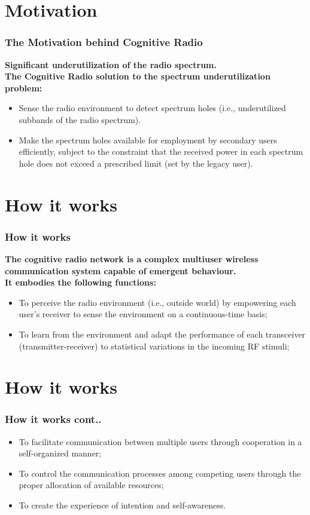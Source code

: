 \documentclass{beamer}
\begin{document}
\section{Motivation}
\begin{frame}
\frametitle{The Motivation behind Cognitive Radio}
\textbf{Significant underutilization of the radio spectrum.}\\
\textbf{The Cognitive Radio solution to the spectrum underutilization problem:}
\begin{itemize}

\item Sense the radio environment to detect spectrum holes (i.e., underutilized subbands of the radio spectrum).
\item Make the spectrum holes available for employment by secondary users efficiently, subject to the constraint that the received power in each spectrum hole does not exceed a prescribed limit (set by the legacy user).

\end{itemize}
\end{frame}

\section{How it works}
\begin{frame}
\frametitle{How it works}
\textbf{The cognitive radio network is a complex multiuser wireless communication system capable of emergent behaviour.}\\
\textbf{It embodies the following functions:}
\begin{itemize}
\item To perceive the radio environment (i.e., outside world) by empowering each user’s receiver to sense the environment on a continuous-time basis;
\item To learn from the environment and adapt the performance of each transceiver (transmitter-receiver) to statistical variations in the incoming RF stimuli;
\end{itemize}
\end{frame}



\section{How it works}
\begin{frame}
\frametitle{How it works cont..}
\begin{itemize}
\item To facilitate communication between multiple users through cooperation in a self-organized manner;
\item To control the communication processes among competing users through the proper allocation of available resources;
\item To create the experience of intention and self-awareness.

\end{itemize}
\end{frame}
\end{document}
